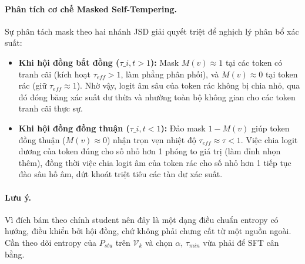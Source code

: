 \documentclass[12pt,a4paper]{article}
\theoremstyle{plain}
\newcommand{\Vk}{\mathcal V_k}
\begin{document}
\paragraph{Phân tích cơ chế Masked Self-Tempering.}
Sự phân tách mask theo hai nhánh JSD giải quyết triệt để nghịch lý phân bổ xác suất:
\begin{itemize}
\item \textbf{Khi hội đồng bất đồng ($\tau\_{i,t} > 1$):} Mask $M(v) \approx 1$ tại các token có tranh cãi (kích hoạt $\tau_{eff} > 1$, làm phẳng phân phối), và $M(v) \approx 0$ tại token rác (giữ $\tau_{eff} \approx 1$). Nhờ vậy, logit âm sâu của token rác không bị chia nhỏ, qua đó đóng băng xác suất dư thừa và nhường toàn bộ không gian cho các token tranh cãi thực sự.
\item \textbf{Khi hội đồng đồng thuận ($\tau\_{i,t} < 1$):} Đảo mask $1 - M(v)$ giúp token đồng thuận ($M(v) \approx 0$) nhận trọn vẹn nhiệt độ $\tau_{eff} \approx \tau < 1$. Việc chia logit dương của token đúng cho số nhỏ hơn 1 phóng to giá trị (làm đỉnh nhọn thêm), đồng thời việc chia logit âm của token rác cho số nhỏ hơn 1 tiếp tục đào sâu hố âm, dứt khoát triệt tiêu các tàn dư xác suất.
\end{itemize}

\paragraph{Lưu ý.}
Vì đích bám theo chính student nên đây là một dạng điều chuẩn entropy có hướng, điều khiển bởi hội đồng, chứ không phải chưng cất từ một nguồn ngoài. Cần theo dõi entropy của $P_{stu}$ trên $\Vk$ và chọn $\alpha$, $\tau_{min}$ vừa phải để SFT cân bằng.
\end{document}

